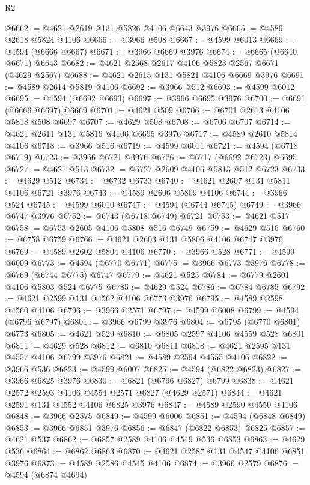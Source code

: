 \begin{lexlean}{R2}
\begin{coremodule}
@6662 := @4621 @2619 @131 @5826 @4106 @6643 @3976
@6665 := @4589 @2618 @5824 @4106
@6666 := @3966 @508
@6667 := @4599 @6013
@6669 := @4594 (@6666 @6667)
@6671 := @3966 @6669 @3976
@6674 := @6665 (@6640 @6671) @6643
@6682 := @4621 @2568 @2617 @4106 @5823 @2567 @6671 (@4629 @2567)
@6688 := @4621 @2615 @131 @5821 @4106 @6669 @3976
@6691 := @4589 @2614 @5819 @4106
@6692 := @3966 @512
@6693 := @4599 @6012
@6695 := @4594 (@6692 @6693)
@6697 := @3966 @6695 @3976
@6700 := @6691 (@6666 @6697) @6669
@6701 := @4621 @509
@6706 := @6701 @2613 @4106 @5818 @508 @6697
@6707 := @4629 @508
@6708 := @6706 @6707
@6714 := @4621 @2611 @131 @5816 @4106 @6695 @3976
@6717 := @4589 @2610 @5814 @4106
@6718 := @3966 @516
@6719 := @4599 @6011
@6721 := @4594 (@6718 @6719)
@6723 := @3966 @6721 @3976
@6726 := @6717 (@6692 @6723) @6695
@6727 := @4621 @513
@6732 := @6727 @2609 @4106 @5813 @512 @6723
@6733 := @4629 @512
@6734 := @6732 @6733
@6740 := @4621 @2607 @131 @5811 @4106 @6721 @3976
@6743 := @4589 @2606 @5809 @4106
@6744 := @3966 @524
@6745 := @4599 @6010
@6747 := @4594 (@6744 @6745)
@6749 := @3966 @6747 @3976
@6752 := @6743 (@6718 @6749) @6721
@6753 := @4621 @517
@6758 := @6753 @2605 @4106 @5808 @516 @6749
@6759 := @4629 @516
@6760 := @6758 @6759
@6766 := @4621 @2603 @131 @5806 @4106 @6747 @3976
@6769 := @4589 @2602 @5804 @4106
@6770 := @3966 @528
@6771 := @4599 @6009
@6773 := @4594 (@6770 @6771)
@6775 := @3966 @6773 @3976
@6778 := @6769 (@6744 @6775) @6747
@6779 := @4621 @525
@6784 := @6779 @2601 @4106 @5803 @524 @6775
@6785 := @4629 @524
@6786 := @6784 @6785
@6792 := @4621 @2599 @131 @4562 @4106 @6773 @3976
@6795 := @4589 @2598 @4560 @4106
@6796 := @3966 @2571
@6797 := @4599 @6008
@6799 := @4594 (@6796 @6797)
@6801 := @3966 @6799 @3976
@6804 := @6795 (@6770 @6801) @6773
@6805 := @4621 @529
@6810 := @6805 @2597 @4106 @4559 @528 @6801
@6811 := @4629 @528
@6812 := @6810 @6811
@6818 := @4621 @2595 @131 @4557 @4106 @6799 @3976
@6821 := @4589 @2594 @4555 @4106
@6822 := @3966 @536
@6823 := @4599 @6007
@6825 := @4594 (@6822 @6823)
@6827 := @3966 @6825 @3976
@6830 := @6821 (@6796 @6827) @6799
@6838 := @4621 @2572 @2593 @4106 @4554 @2571 @6827 (@4629 @2571)
@6844 := @4621 @2591 @131 @4552 @4106 @6825 @3976
@6847 := @4589 @2590 @4550 @4106
@6848 := @3966 @2575
@6849 := @4599 @6006
@6851 := @4594 (@6848 @6849)
@6853 := @3966 @6851 @3976
@6856 := @6847 (@6822 @6853) @6825
@6857 := @4621 @537
@6862 := @6857 @2589 @4106 @4549 @536 @6853
@6863 := @4629 @536
@6864 := @6862 @6863
@6870 := @4621 @2587 @131 @4547 @4106 @6851 @3976
@6873 := @4589 @2586 @4545 @4106
@6874 := @3966 @2579
@6876 := @4594 (@6874 @4694)

\end{coremodule}
\end{lexlean}
